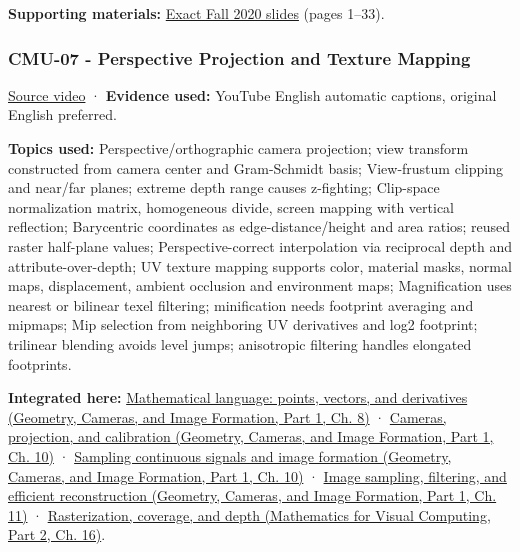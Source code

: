\textbf{Supporting materials:} \href{https://15462.courses.cs.cmu.edu/fall2020content/lectures/06_3drotations/06_3drotations_slides.pdf}{Exact Fall 2020 slides} (pages 1--33).

\subsubsection{CMU-07 - Perspective Projection and Texture Mapping}\label{04-visual-computing-ii-ch036-cmu-07---perspective-projection-and-texture-mapping}

\hypertarget{04-visual-computing-ii-ch036-cmu-07---perspective-projection-and-texture-mapping}{}

\href{https://www.youtube.com/watch?v=_4Q4O2Kgdo4}{Source video} · \textbf{Evidence used:} YouTube English automatic captions, original English preferred.

\textbf{Topics used:} Perspective/orthographic camera projection; view transform constructed from camera center and Gram-Schmidt basis; View-frustum clipping and near/far planes; extreme depth range causes z-fighting; Clip-space normalization matrix, homogeneous divide, screen mapping with vertical reflection; Barycentric coordinates as edge-distance/height and area ratios; reused raster half-plane values; Perspective-correct interpolation via reciprocal depth and attribute-over-depth; UV texture mapping supports color, material masks, normal maps, displacement, ambient occlusion and environment maps; Magnification uses nearest or bilinear texel filtering; minification needs footprint averaging and mipmaps; Mip selection from neighboring UV derivatives and log2 footprint; trilinear blending avoids level jumps; anisotropic filtering handles elongated footprints.

\textbf{Integrated here:} \href{../03-Geometry-Cameras-and-Image-Formation-P01/main.pdf\#nameddest=03-visual-computing-i-ch001-mathematical-language-points-vectors-and-derivatives}{Mathematical language: points, vectors, and derivatives (Geometry, Cameras, and Image Formation, Part 1, Ch. 8)} · \href{../03-Geometry-Cameras-and-Image-Formation-P01/main.pdf\#nameddest=03-visual-computing-i-ch003-cameras-projection-and-calibration}{Cameras, projection, and calibration (Geometry, Cameras, and Image Formation, Part 1, Ch. 10)} · \href{../03-Geometry-Cameras-and-Image-Formation-P01/main.pdf\#nameddest=03-visual-computing-i-ch003-sampling-continuous-signals-and-image-formation}{Sampling continuous signals and image formation (Geometry, Cameras, and Image Formation, Part 1, Ch. 10)} · \href{../03-Geometry-Cameras-and-Image-Formation-P01/main.pdf\#nameddest=03-visual-computing-i-ch004-image-sampling-filtering-and-efficient-reconstruction}{Image sampling, filtering, and efficient reconstruction (Geometry, Cameras, and Image Formation, Part 1, Ch. 11)} · \href{../02-Mathematics-for-Visual-Computing-P02/main.pdf\#nameddest=03-visual-computing-i-ch012-rasterization-coverage-and-depth}{Rasterization, coverage, and depth (Mathematics for Visual Computing, Part 2, Ch. 16)}.


